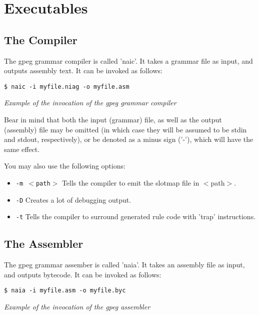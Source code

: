 \section{Executables}

\subsection{The Compiler}

The gpeg grammar compiler is called 'naic'.
It takes a grammar file as input, and outputs assembly text.
It can be invoked as follows:

\begin{myquote}
\begin{verbatim}
$ naic -i myfile.niag -o myfile.asm
\end{verbatim}
\end{myquote}
\textit{Example of the invocation of the gpeg grammar compiler}

Bear in mind that both the input (grammar) file, as well as the
output (assembly) file may be omitted (in which case they will be
assumed to be stdin and stdout, respectively), or be denoted as
a minus sign ('-'), which will have the same effect.

You may also use the following options:

\begin{itemize}
\item \texttt{-m $<$path$>$} Tells the compiler to emit the slotmap
      file in $<$path$>$.
\item \texttt{-D} Creates a lot of debugging output.
\item \texttt{-t} Tells the compiler to surround generated rule
      code with 'trap' instructions.
\end{itemize}

\subsection{The Assembler}

The gpeg grammar assember is called 'naia'.
It takes an assembly file as input, and outputs bytecode.
It can be invoked as follows:

\begin{myquote}
\begin{verbatim}
$ naia -i myfile.asm -o myfile.byc
\end{verbatim}
\end{myquote}
\textit{Example of the invocation of the gpeg assembler}

